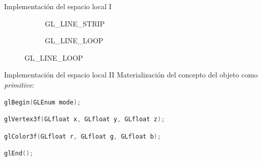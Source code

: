 \documentclass{beamer}
\begin{document}
\begin{frame}{Implementación del espacio local I}
\begin{figure} [h]
\begin{subfigure} {0.3\textwidth}
    \caption{GL\_LINE\_STRIP}
  \end{subfigure}
  \begin{subfigure} {0.3\textwidth}
    \centering

    \caption{GL\_LINE\_LOOP}
  \end{subfigure}
\end{figure}

\end{frame}

\begin{frame}[fragile]{Implementación del espacio local II}
  Materialización del concepto del objeto como \textit{primitive}:
  \begin{lstlisting}[language=C++,basicstyle=\ttfamily,keywordstyle=\color{red},xleftmargin=-25pt,
      xrightmargin=5pt]
    glBegin(GLEnum mode);
  \end{lstlisting}
  \begin{lstlisting}[language=C++,basicstyle=\ttfamily,keywordstyle=\color{red},xleftmargin=-25pt,
      xrightmargin=5pt]
    glVertex3f(GLfloat x, GLfloat y, GLfloat z);
  \end{lstlisting}
  \begin{lstlisting}[language=C++,basicstyle=\ttfamily,keywordstyle=\color{red},xleftmargin=-25pt,
      xrightmargin=5pt]
    glColor3f(GLfloat r, GLfloat g, GLfloat b);
  \end{lstlisting}
  \begin{lstlisting}[language=C++,basicstyle=\ttfamily,keywordstyle=\color{red},xleftmargin=-25pt,
      xrightmargin=5pt]
    glEnd();
     
  \end{lstlisting}

\end{frame}
\end{document}
